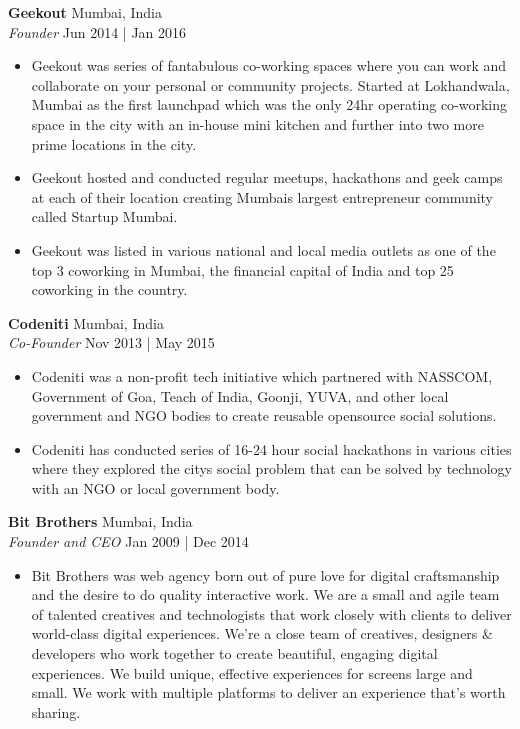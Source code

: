 \documentclass[a4paper]{article}
\begin{document}
\textbf{Geekout} \hfill Mumbai, India\\
\textit{Founder} \hfill Jun 2014 | Jan 2016\\
\vspace{-1mm}
\begin{itemize} \itemsep 1pt
	\item Geekout was series of fantabulous co-working spaces where you can work and collaborate on your personal or community projects. Started at Lokhandwala, Mumbai as the first launchpad which was the only 24hr operating co-working space in the city with an in-house mini kitchen and further into two more prime locations in the city.
	\item Geekout hosted and conducted regular meetups, hackathons and geek camps at each of their location creating Mumbai\textquotesingle{}s largest entrepreneur community called Startup Mumbai.
	\item Geekout was listed in various national and local media outlets as one of the top 3 coworking in Mumbai, the financial capital of India and top 25 coworking in the country.
\end{itemize}
\textbf{Codeniti} \hfill Mumbai, India\\
\textit{Co-Founder} \hfill Nov 2013 | May 2015\\
\vspace{-1mm}
\begin{itemize} \itemsep 1pt
	\item Codeniti was a non-profit tech initiative which partnered with NASSCOM, Government of Goa, Teach of India, Goonji, YUVA, and other local government and NGO bodies to create reusable opensource social solutions.
	\item Codeniti has conducted series of 16-24 hour social hackathons in various cities where they explored the city\textquotesingle{}s social problem that can be solved by technology with an NGO or local government body.
\end{itemize}
\textbf{Bit Brothers} \hfill Mumbai, India\\
\textit{Founder and CEO} \hfill Jan 2009 | Dec 2014\\
\vspace{-1mm}
\begin{itemize} \itemsep 1pt
	\item Bit Brothers was web agency born out of pure love for digital craftsmanship and the desire to do quality interactive work. We are a small and agile team of talented creatives and technologists that work closely with clients to deliver world-class digital experiences. We’re a close team of creatives, designers \& developers who work together to create beautiful, engaging digital experiences. We build unique, effective experiences for screens large and small. We work with multiple platforms to deliver an experience that’s worth sharing.
\end{itemize}
\end{document}
